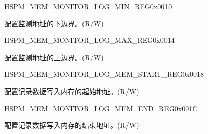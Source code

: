 \begin{register}{H}{SPM\_MEM\_MONITOR\_LOG\_MIN\_REG}{0x0010}\label{regdesc:SPMMEMMONITORLOGMINREG}
%
\regnewline%
\begin{regdesc}\begin{reglist}
\label{fielddesc:SPMMEMMONITORLOGMIN}\item [SPM\_MEM\_MONITOR\_LOG\_MIN] 配置监测地址的下边界。(R/W)
\end{reglist}\end{regdesc}
\end{register}


\begin{register}{H}{SPM\_MEM\_MONITOR\_LOG\_MAX\_REG}{0x0014}\label{regdesc:SPMMEMMONITORLOGMAXREG}
%
\regnewline%
\begin{regdesc}\begin{reglist}
\label{fielddesc:SPMMEMMONITORLOGMAX}\item [SPM\_MEM\_MONITOR\_LOG\_MAX] 配置监测地址的上边界。(R/W)
\end{reglist}\end{regdesc}
\end{register}


\begin{register}{H}{SPM\_MEM\_MONITOR\_LOG\_MEM\_START\_REG}{0x0018}\label{regdesc:SPMMEMMONITORLOGMEMSTARTREG}
%
\regnewline%
\begin{regdesc}\begin{reglist}
\label{fielddesc:SPMMEMMONITORLOGMEMSTART}\item [SPM\_MEM\_MONITOR\_LOG\_MEM\_START] 配置记录数据写入内存的起始地址。(R/W)
\end{reglist}\end{regdesc}
\end{register}


\begin{register}{H}{SPM\_MEM\_MONITOR\_LOG\_MEM\_END\_REG}{0x001C}\label{regdesc:SPMMEMMONITORLOGMEMENDREG}
%
\regnewline%
\begin{regdesc}\begin{reglist}
\label{fielddesc:SPMMEMMONITORLOGMEMEND}\item [SPM\_MEM\_MONITOR\_LOG\_MEM\_END] 配置记录数据写入内存的结束地址。(R/W)
\end{reglist}\end{regdesc}
\end{register}


